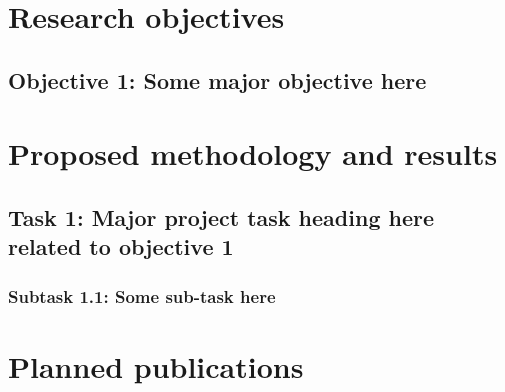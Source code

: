 \documentclass[12pt]{article}
\numberwithin{equation}{section}
\begin{document}

\section{Research objectives}                   %

\blindtext


\subsection*{Objective 1: Some major objective here}

\blindtext







\section{Proposed methodology and results}  %

\subsection{Task 1: Major project task heading here related to objective 1}

\blindtext




\subsubsection*{Subtask 1.1: Some sub-task here}
\blindtext






\section{Planned publications}
\end{document}
